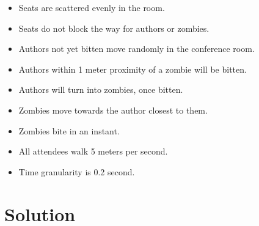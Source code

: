 \begin{itemize}[itemsep=1mm]\parskip=0pt
\item[] Seats are scattered evenly in the room.
\item[] Seats do not block the way for authors or zombies.
\item[] Authors not yet bitten move randomly in the conference room.
\item[] Authors within 1 meter proximity of a zombie will be bitten.
\item[] Authors will turn into zombies, once bitten.
\item[] Zombies move towards the author closest to them.
\item[] Zombies bite in an instant.
\item[] All attendees walk 5 meters per second.
\item[] Time granularity is 0.2 second.
\end{itemize}

\section*{Solution}

